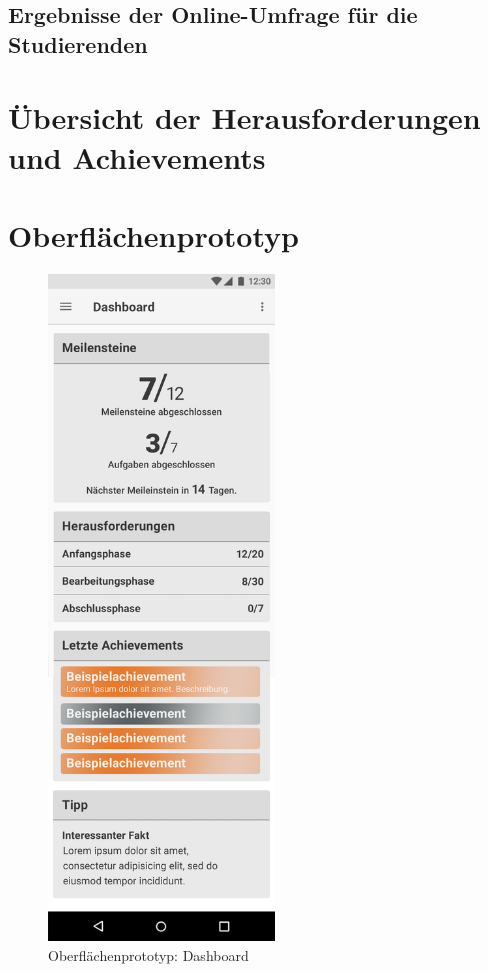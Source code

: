 \documentclass[bibliography=totoc,listof=totoc,BCOR=5mm,DIV=12,oneside]{scrbook}
\begin{document}
{\subsection{Ergebnisse der Online-Umfrage für die Studierenden}
\label{anhang:onlineUmfrageStudierendeErgebnisse}


\section{Übersicht der Herausforderungen und Achievements}
\label{anhang:achievementuebersicht}


\section{Oberflächenprototyp}
\label{anhang:oberflaeche}
\begin{figure}[H]
	\centering
	\includegraphics[width=6cm]{Bilder/Prototyp/photoshop_screenshots/Dashboard.png}
\caption{Oberflächenprototyp: Dashboard}
\label{img:ptototypDashboard}
\end{figure}

}
\end{document}
